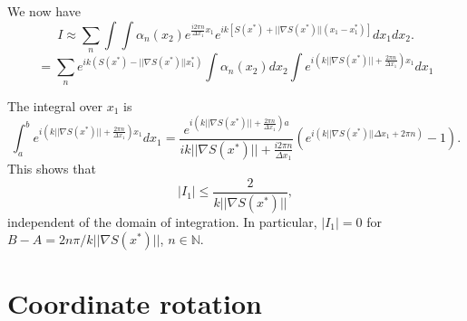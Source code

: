 \documentclass{article}
\newcommand{\norm}[1]{||#1||}
\theoremstyle{plain}
\begin{document}
We now have
\begin{equation}
	I \approx \sum_n \int\int \alpha_n(x_2) e^{ \frac{i2\pi n}{ \Delta x_1 }x_1 }
	e^{ik\left[S(x^*) + \norm{\nabla S(x^*)}(x_1-x_1^*) \right]} dx_1dx_2.
\end{equation}
\begin{equation}
	= \sum_n e^{ik \left( S(x^*) - \norm{\nabla S(x^*)}x_1^* \right)} 
	\int \alpha_n(x_2) dx_2 
	\int e^{ i\left( k\norm{\nabla S(x^*)} + \frac{2\pi n}{ \Delta x_1 }\right) x_1 } dx_1
\end{equation}



The integral over $x_1$ is
\begin{equation}
	\int_a^b e^{ i\left( k\norm{\nabla S(x^*)} + \frac{2\pi n}{ \Delta x_1 }\right) x_1 } dx_1
	= \frac{e^{ i\left( k\norm{\nabla S(x^*)} + \frac{2\pi n}{ \Delta x_1 }\right) a } }{ ik\norm{\nabla S(x^*)} + \frac{i2\pi n}{ \Delta x_1 } }
	\left( e^{ i\left( k\norm{\nabla S(x^*)}\Delta x_1 + 2\pi n \right)  } - 1 \right).
\end{equation}
This shows that
\begin{equation}
	|I_1| \leq \frac{2}{k\norm{\nabla S(x^*)}},
\end{equation}
independent of the domain of integration.
In particular, $|I_1| = 0$ for $B-A = 2n\pi / k\norm{\nabla S(x^*)}$, $n\in\mathbb{N}$.






\section{Coordinate rotation}\label{sec_rotation}
\end{document}
